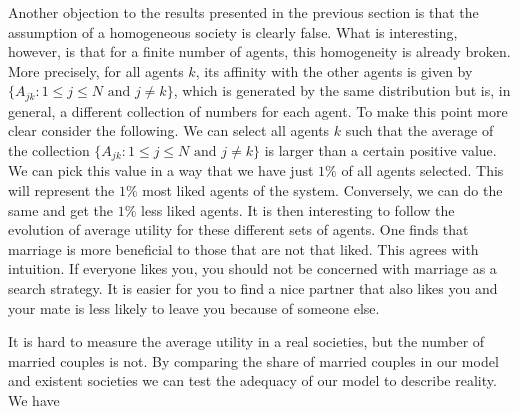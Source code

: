 \documentclass[12pt]{article}
\begin{document}
Another objection to the results presented in the previous section is that the assumption of a homogeneous society is clearly false. What is interesting, however, is that for a finite number of agents, this homogeneity is already broken. More precisely, for all agents $k$, its affinity with the other agents is given by $\{A_{jk}:1\leq j\leq N\textrm{ and } j\neq k\}$, which is generated by the same distribution but is, in general, a different collection of numbers for each agent. To make this point more clear consider the following. We can select all agents $k$ such that the average of the collection $\{A_{jk}:1\leq j\leq N\textrm{ and } j\neq k\}$ is larger than a certain positive value. We can pick this value in a way that we have just $1\%$ of all agents selected. This will represent the $1\%$ most liked agents of the system. Conversely, we can do the same and get the $1\%$ less liked agents. It is then interesting to follow the evolution of average utility for these different sets of agents.
One finds that marriage is more beneficial to those that are not that liked. This agrees with intuition. If everyone likes you, you should not be concerned with marriage as a search strategy. It is easier for you to find a nice partner that also likes you and your mate is less likely to leave you because of someone else.

It is hard to measure the average utility in a real societies, but the number of married couples is not. By comparing the share of married couples in our model and existent societies we can test the adequacy of our model to describe reality. We have
\end{document}
